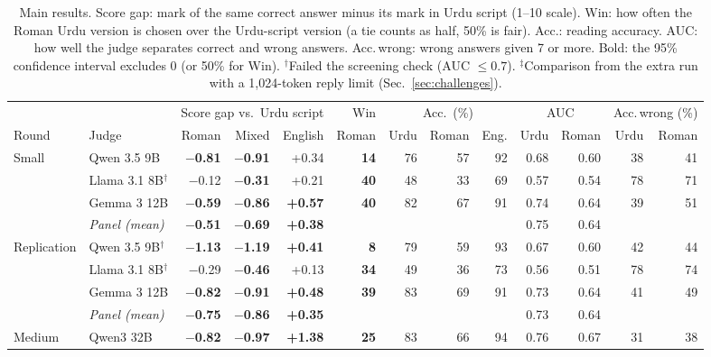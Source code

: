 \begin{table}[t]
\centering
\caption{Main results. Score gap: mark of the same correct answer minus its mark in Urdu script (1--10 scale). Win: how often the Roman Urdu version is chosen over the Urdu-script version (a tie counts as half, 50\% is fair). Acc.: reading accuracy. AUC: how well the judge separates correct and wrong answers. Acc.\,wrong: wrong answers given 7 or more. Bold: the 95\% confidence interval excludes 0 (or 50\% for Win). $^\dagger$Failed the screening check (AUC $\leq 0.7$). $^\ddagger$Comparison from the extra run with a 1{,}024-token reply limit (Sec.~\ref{sec:challenges}).}
\label{tab:main}
\small
\setlength{\tabcolsep}{4pt}
\begin{tabular}{@{}ll rrr r rrr rr rr@{}}
\toprule
 & & \multicolumn{3}{c}{Score gap vs.\ Urdu script} & Win & \multicolumn{3}{c}{Acc.\ (\%)} & \multicolumn{2}{c}{AUC} & \multicolumn{2}{c}{Acc.\,wrong (\%)} \\
\cmidrule(lr){3-5}\cmidrule(lr){6-6}\cmidrule(lr){7-9}\cmidrule(lr){10-11}\cmidrule(lr){12-13}
Round & Judge & Roman & Mixed & English & Roman & Urdu & Roman & Eng. & Urdu & Roman & Urdu & Roman \\
\midrule
Small & Qwen 3.5 9B & \textbf{$-$0.81} & \textbf{$-$0.91} & +0.34 & \textbf{14} & 76 & 57 & 92 & 0.68 & 0.60 & 38 & 41 \\
 & Llama 3.1 8B$^\dagger$ & $-$0.12 & \textbf{$-$0.31} & +0.21 & \textbf{40} & 48 & 33 & 69 & 0.57 & 0.54 & 78 & 71 \\
 & Gemma 3 12B & \textbf{$-$0.59} & \textbf{$-$0.86} & \textbf{+0.57} & \textbf{40} & 82 & 67 & 91 & 0.74 & 0.64 & 39 & 51 \\
 & \emph{Panel (mean)} & \textbf{$-$0.51} & \textbf{$-$0.69} & \textbf{+0.38} &  &  &  &  & 0.75 & 0.64 &  &  \\
\midrule
Replication & Qwen 3.5 9B$^\dagger$ & \textbf{$-$1.13} & \textbf{$-$1.19} & \textbf{+0.41} & \textbf{8} & 79 & 59 & 93 & 0.67 & 0.60 & 42 & 44 \\
 & Llama 3.1 8B$^\dagger$ & $-$0.29 & \textbf{$-$0.46} & +0.13 & \textbf{34} & 49 & 36 & 73 & 0.56 & 0.51 & 78 & 74 \\
 & Gemma 3 12B & \textbf{$-$0.82} & \textbf{$-$0.91} & \textbf{+0.48} & \textbf{39} & 83 & 69 & 91 & 0.73 & 0.64 & 41 & 49 \\
 & \emph{Panel (mean)} & \textbf{$-$0.75} & \textbf{$-$0.86} & \textbf{+0.35} &  &  &  &  & 0.73 & 0.64 &  &  \\
\midrule
Medium & Qwen3 32B & \textbf{$-$0.82} & \textbf{$-$0.97} & \textbf{+1.38} & \textbf{25} & 83 & 66 & 94 & 0.76 & 0.67 & 31 & 38 \\

\end{tabular}
\end{table}
